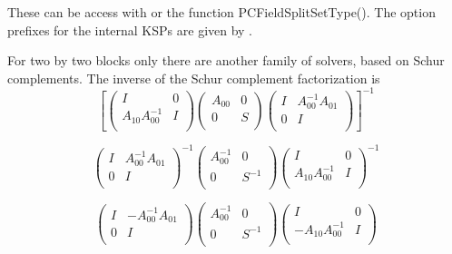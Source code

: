 These can be access with   or the function PCFieldSplitSetType(). The option prefixes for the internal KSPs are given by .

For two by two blocks only there are another family of solvers, based on Schur complements. The inverse of the Schur complement factorization is  
\[
\left[ 
\left( \begin{array}{cc}
I   & 0 \\
A_{10}A_{00}^{-1} & I \\
\end{array} \right)
\left( \begin{array}{cc}
A_{00}  & 0 \\
0 & S \\
\end{array} \right)
\left( \begin{array}{cc}
I   & A_{00}^{-1} A_{01} \\
0 & I \\
\end{array} \right)
\right]^{-1}
\]


\[
\left( \begin{array}{cc}
I   & A_{00}^{-1} A_{01} \\
0 & I \\
\end{array} \right)^{-1}
\left( \begin{array}{cc}
A_{00}^{-1}  & 0 \\
0 & S^{-1} \\
\end{array} \right)
\left( \begin{array}{cc}
I   & 0 \\
A_{10}A_{00}^{-1} & I \\
\end{array} \right)^{-1}
\]

\[
\left( \begin{array}{cc}
I   & -A_{00}^{-1} A_{01} \\
0 & I \\
\end{array} \right)
\left( \begin{array}{cc}
A_{00}^{-1}  & 0 \\
0 & S^{-1} \\
\end{array} \right)
\left( \begin{array}{cc}
I   & 0 \\
-A_{10}A_{00}^{-1} & I \\
\end{array} \right)
\]

